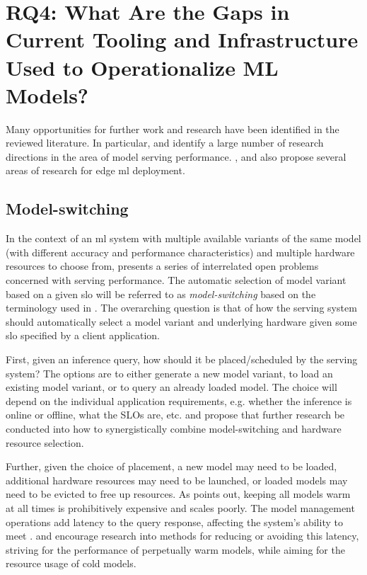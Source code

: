 \section{RQ4: What Are the Gaps in Current Tooling and Infrastructure Used to Operationalize ML Models?}
\label{ch:research_results:rq4_gaps}

Many opportunities for further work and research have been identified in the reviewed literature.
In particular, \cite{Yadwadkar2019} and \cite{Zhang2020} identify a large number of research directions in the area of model serving performance.
\cite{Bosch2021}, \cite{Rausch2019} and \cite{Gupta2020} also propose several areas of research for edge \acrshort{ml} deployment.

\subsection{Model-switching}
In the context of an \acrshort{ml} system with multiple available variants of the same model (with different accuracy and performance characteristics) and multiple hardware resources to choose from, \cite{Yadwadkar2019} presents a series of interrelated open problems concerned with serving performance.
The automatic selection of model variant based on a given \acrshort{slo} will be referred to as \textit{model-switching} based on the terminology used in \cite{Zhang2020}. 
The overarching question is that of how the serving system should automatically select a model variant and underlying hardware given some \acrshort{slo} specified by a client application.

First, given an inference query, how should it be placed/scheduled by the serving system?
The options are to either generate a new model variant, to load an existing model variant, or to query an already loaded model.
The choice will depend on the individual application requirements, e.g. whether the inference is online or offline, what the SLOs are, etc.
\cite{Yadwadkar2019} and \cite{Zhang2020} propose that further research be conducted into how to synergistically combine model-switching and hardware resource selection.

Further, given the choice of placement, a new model may need to be loaded, additional hardware resources may need to be launched, or loaded models may need to be evicted to free up resources.
As \cite{Zhang2020} points out, keeping all models warm at all times is prohibitively expensive and scales poorly.
The model management operations add latency to the query response, affecting the system's ability to meet .
\cite{Yadwadkar2019} and \cite{Zhang2020} encourage research into methods for reducing or avoiding this latency, striving for the performance of perpetually warm models, while aiming for the resource usage of cold models.

